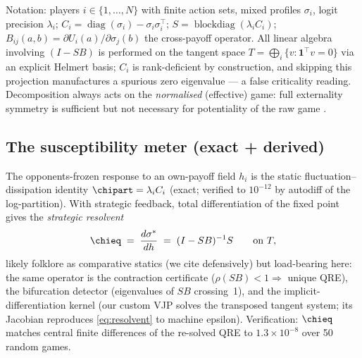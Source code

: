 Notation: players $i\in\{1,\dots,N\}$ with finite action sets, mixed profiles
$\sigma_i$, logit precision $\lambda_i$; $C_i=\operatorname{diag}(\sigma_i)-\sigma_i\sigma_i^\top$;
$S=\operatorname{blockdiag}(\lambda_iC_i)$; $B_{ij}(a,b)=\partial U_i(a)/\partial\sigma_j(b)$
the cross-payoff operator. All linear algebra involving $(I-SB)$ is performed
on the tangent space $T=\bigoplus_i\{v:\mathbf{1}^\top v=0\}$ via an explicit
Helmert basis; $C_i$ is rank-deficient by construction, and skipping this
projection manufactures a spurious zero eigenvalue --- a false criticality
reading. Decomposition always acts on the \emph{normalised} (effective) game:
full externality symmetry is sufficient but not necessary for potentiality of
the raw game \citep{legacci2024}.

\subsection{The susceptibility meter (exact + derived)}
The opponents-frozen response to an own-payoff field $h_i$ is the static
fluctuation--dissipation identity $\chipart=\lambda_i C_i$ (exact; verified to
$10^{-12}$ by autodiff of the log-partition). With strategic feedback,
total differentiation of the fixed point gives the \emph{strategic resolvent}
\begin{equation}
\chieq \;=\; \frac{d\sigma^*}{dh} \;=\; (I-SB)^{-1}S \qquad\text{on } T,
\label{eq:resolvent}
\end{equation}
likely folklore as comparative statics (we cite defensively) but load-bearing
here: the same operator is the contraction certificate ($\rho(SB)<1\Rightarrow$
unique QRE), the bifurcation detector (eigenvalues of $SB$ crossing~1), and the
implicit-differentiation kernel (our custom VJP solves the transposed tangent
system; its Jacobian reproduces \eqref{eq:resolvent} to machine epsilon).
Verification: $\chieq$ matches central finite differences of the re-solved QRE
to $1.3\times10^{-8}$ over 50 random games.

